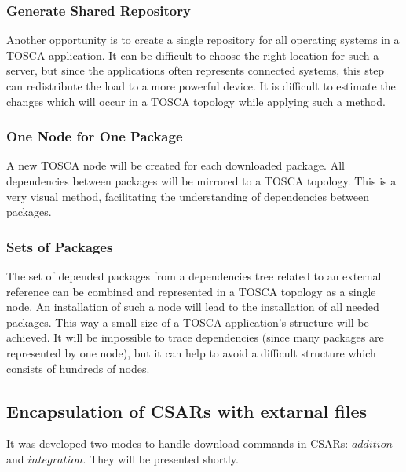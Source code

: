 \subsubsection*{Generate Shared Repository}
Another opportunity is to create a single repository for all operating systems in a TOSCA application.
It can be difficult to choose the right location for such a server, but since the applications often represents connected systems, this step can redistribute the load to a more powerful device.
It is difficult to estimate the changes which will occur in a TOSCA topology while applying such a method.
\subsubsection*{One Node for One Package}
A new TOSCA node will be created for each downloaded package. 
All dependencies between packages will be mirrored to a TOSCA topology.
This is a very visual method, facilitating the understanding of dependencies between packages.
\subsubsection*{Sets of Packages} \label{mode:setsofpkg}
The set of depended packages from a dependencies tree related to an external reference can be combined and represented in a TOSCA topology as a single node.
An installation of such a node will lead to the installation of all needed packages.
This way a small size of a TOSCA application's structure will be achieved.
It will be impossible to trace dependencies (since many packages are represented by one node), but it can help to avoid a difficult structure which consists of hundreds of nodes. 

\subsection{Encapsulation of CSARs with extarnal files}
It was developed two modes to handle download commands in CSARs: $addition$ and $integration$.
They will be presented shortly.

